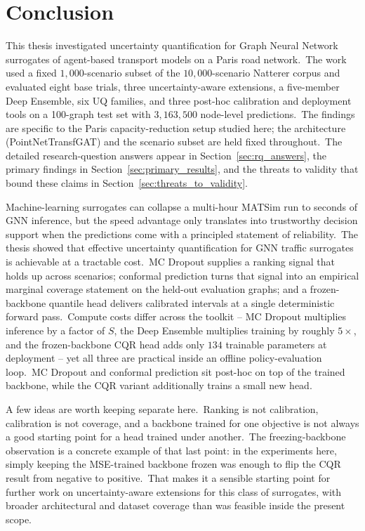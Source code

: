 
\chapter{Conclusion}\label{chapter:conclusion}

This thesis investigated uncertainty quantification for Graph Neural Network surrogates of agent-based transport models on a Paris road network.\ The work used a fixed $1{,}000$-scenario subset of the $10{,}000$-scenario Natterer corpus and evaluated eight base trials, three uncertainty-aware extensions, a five-member Deep Ensemble, six UQ families, and three post-hoc calibration and deployment tools on a 100-graph test set with $3{,}163{,}500$ node-level predictions.\ The findings are specific to the Paris capacity-reduction setup studied here; the architecture (PointNetTransfGAT) and the scenario subset are held fixed throughout.\ The detailed research-question answers appear in Section~\ref{sec:rq_answers}, the primary findings in Section~\ref{sec:primary_results}, and the threats to validity that bound these claims in Section~\ref{sec:threats_to_validity}.

Machine-learning surrogates can collapse a multi-hour MATSim run to seconds of GNN inference, but the speed advantage only translates into trustworthy decision support when the predictions come with a principled statement of reliability.\ The thesis showed that effective uncertainty quantification for GNN traffic surrogates is achievable at a tractable cost.\ MC Dropout supplies a ranking signal that holds up across scenarios; conformal prediction turns that signal into an empirical marginal coverage statement on the held-out evaluation graphs; and a frozen-backbone quantile head delivers calibrated intervals at a single deterministic forward pass.\ Compute costs differ across the toolkit -- MC Dropout multiplies inference by a factor of $S$, the Deep Ensemble multiplies training by roughly $5\times$, and the frozen-backbone CQR head adds only $134$ trainable parameters at deployment -- yet all three are practical inside an offline policy-evaluation loop.\ MC Dropout and conformal prediction sit post-hoc on top of the trained backbone, while the CQR variant additionally trains a small new head.

A few ideas are worth keeping separate here.\ Ranking is not calibration, calibration is not coverage, and a backbone trained for one objective is not always a good starting point for a head trained under another.\ The freezing-backbone observation is a concrete example of that last point: in the experiments here, simply keeping the MSE-trained backbone frozen was enough to flip the CQR result from negative to positive.\ That makes it a sensible starting point for further work on uncertainty-aware extensions for this class of surrogates, with broader architectural and dataset coverage than was feasible inside the present scope.

